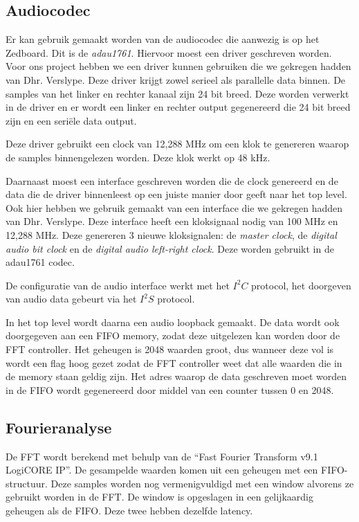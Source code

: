 \documentclass[a4paper,kul]{kulakarticle} %
\begin{document}
\subsection{Audiocodec}

Er kan gebruik gemaakt worden van de audiocodec die aanwezig is op het Zedboard. Dit is de \textit{adau1761}. Hiervoor moest een driver geschreven worden. Voor ons project hebben we een driver kunnen gebruiken die we gekregen hadden van Dhr. Verslype. Deze driver krijgt zowel serieel als parallelle data binnen. De samples van het linker en rechter kanaal zijn 24 bit breed. Deze worden verwerkt in de driver en er wordt een linker en rechter output gegenereerd die 24 bit breed zijn en een seriële data output.

Deze driver gebruikt een clock van 12,288 MHz om een klok te genereren waarop de samples binnengelezen worden. Deze klok werkt op 48 kHz.  \newline

Daarnaast moest een interface geschreven worden die de clock genereerd en de data die de driver binnenleest op een juiste manier door geeft naar het top level. Ook hier hebben we gebruik gemaakt van een interface die we gekregen hadden van Dhr. Verslype. Deze interface heeft een kloksignaal nodig van 100 MHz en 12,288 MHz. Deze genereren 3 nieuwe kloksignalen: de \textit{master clock}, de \textit{digital audio bit clock} en de \textit{digital audio left-right clock}. Deze worden gebruikt in de adau1761 codec. \newline

De configuratie van de audio interface werkt met het $I^2C$ protocol, het doorgeven van audio data gebeurt via het $I^2S$ protocol.\newline

In het top level wordt daarna een audio loopback gemaakt. De data wordt ook doorgegeven aan een FIFO memory, zodat deze uitgelezen kan worden door de FFT controller. Het geheugen is 2048 waarden groot, dus wanneer deze vol is wordt een flag hoog gezet zodat de FFT controller weet dat alle waarden die in de memory staan geldig zijn. Het adres waarop de data geschreven moet worden in de FIFO wordt gegenereerd door middel van een counter tussen 0 en 2048. 

\subsection{Fourieranalyse}

De FFT wordt berekend met behulp van de “Fast Fourier Transform v9.1 LogiCORE IP”. De gesampelde waarden komen uit een geheugen met een FIFO-structuur. Deze samples worden nog vermenigvuldigd met een window alvorens ze gebruikt worden in de FFT. De window is opgeslagen in een gelijkaardig geheugen als de FIFO. Deze twee hebben dezelfde latency.
\end{document}
